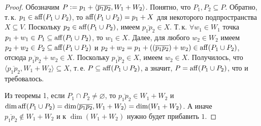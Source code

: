 \begin{proof}
    Обозначим $P \vcentcolon = p_1 + \langle\overline{p_1p_2}, W_1 + W_2\rangle$. Понятно, что $P_1, P_2 \subseteq P$. Обратно, т.\,к. $p_1 \in \operatorname{aff}(P_1 \cup P_2)$, то $\operatorname{aff}(P_1 \cup P_2) = p_1 + X$ для некоторого подпространства $X \subseteq V$. Поскольку $p_2 \in \operatorname{aff}(P_1 \cup P_2)$, имеем $\overline{p_1p_2} \in X$. Т.\,к. $\forall w_1 \in W_1$ точка $p_1 + w_1 \in P_1 \subseteq \operatorname{aff}(P_1 \cup P_2)$, то $w_1 \in X$. Далее, для любого $w_2 \in W_2$ имеем $p_2 + w_2 \in P_2 \subseteq \operatorname{aff}(P_1 \cup P_2)$ и $p_2 + w_2 = p_1 + ((\overline{p_1p_2}) + w_2) \in \operatorname{aff}(P_1 \cup P_2)$, отсюда $\overline{p_1p_2} + w_2 \in X$. Поскольку $\overline{p_1p_2} \in X$, имеем $w_2 \in X$. Получилось, что $\langle\overline{p_1p_2}, W_1 + W_2\rangle \subseteq X$, т.\,е. $P \subseteq \operatorname{aff}(P_1 \cup P_2)$, а значит, $P = \operatorname{aff}(P_1 \cup P_2)$, что и требовалось.

    Из теоремы 1, если $P_1 \cap P_2 \ne \varnothing$, то $\overline{p_1p_2} \in W_1 + W_2$ и $\dim\operatorname{aff}(P_1 \cup P_2) = \dim\langle\overline{p_1p_2}, W_1 + W_2\rangle = \dim(W_1 + W_2)$. А иначе $\overline{p_1p_2} \notin W_1 + W_2$ и к $\dim(W_1 + W_2)$ нужно будет прибавить $1$.
\end{proof}

